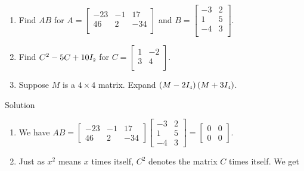 \begin{example} \label{matrixmultex} 
		
\begin{enumerate}
	\item  Find $AB$ for $A = \left[ \begin{array}{rrr} -23 & -1 & 17 \\ 46 & 2 & -34 \\ \end{array} \right]$ and $B = \left[ \begin{array}{rr} -3 & 2 \\ 1 & 5 \\ -4 & 3 \\ \end{array} \right].$
		
	\item  Find $C^2 -5C + 10I_{\mbox{\tiny$2$}}$ for $C = \left[ \begin{array}{rr} 1 & -2 \\ 3 & 4 \\ \end{array} \right].$
		
	\item  Suppose $M$ is a $4 \times 4$ matrix. Expand $\left(M - 2I_{\mbox{\tiny$4$}}\right)\left(M + 3I_{\mbox{\tiny$4$}}\right)$.
		
\end{enumerate}


	
Solution 


	
	\begin{enumerate}
		
		\item  We have $AB = \left[ \begin{array}{rrr} -23 & -1 & 17 \\ 46 & 2 & -34  \end{array} \right] \left[ \begin{array}{rr} -3 & 2 \\ 1 & 5 \\ -4 & 3  \end{array} \right] =  \left[ \begin{array}{rr} 0 & 0 \\ 0 & 0  \end{array} \right] $.
		
		
		\item Just as $x^2$ means $x$ times itself, $C^2$ denotes the matrix $C$ times itself.  We get
		

\end{enumerate}
\end{example}
